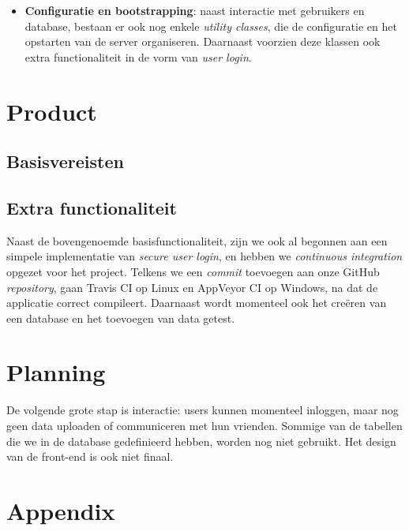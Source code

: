\documentclass[12pt,a4paper]{article}
\begin{document}
\begin{itemize}
\item \textbf{Configuratie en bootstrapping}: naast interactie met gebruikers en database, bestaan er ook nog enkele \emph{utility classes}, die de configuratie en het opstarten van de server organiseren. Daarnaast voorzien deze klassen ook extra functionaliteit in de vorm van \emph{user login}. 

\end{itemize}

\section{Product}

\subsection{Basisvereisten}

\subsection{Extra functionaliteit}

Naast de bovengenoemde basisfunctionaliteit, zijn we ook al begonnen aan een simpele implementatie van \emph{secure user login}, en hebben we \emph{continuous integration} opgezet voor het project. Telkens we een \emph{commit} toevoegen aan onze GitHub \emph{repository}, gaan Travis CI op Linux en AppVeyor CI op Windows, na dat de applicatie correct compileert. Daarnaast wordt momenteel ook het cre\"eren van een database en het toevoegen van data getest.

\section{Planning}
De volgende grote stap is interactie: users kunnen momenteel inloggen, maar nog
geen data uploaden of communiceren met hun vrienden. Sommige van de tabellen 
die we in de database gedefinieerd hebben, worden nog niet gebruikt. Het design 
van de front-end is ook niet finaal.

\section{Appendix}
\end{document}
